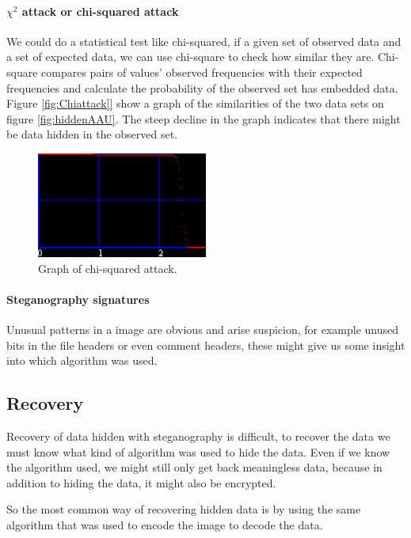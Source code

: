 \paragraph*{$\chi^2$ attack or chi-squared attack}
We could do a statistical test like chi-squared, if a given set of observed data and a set of expected data, we can use chi-square to check how similar they are.
Chi-square compares pairs of values' observed frequencies with their expected frequencies and calculate the probability of the observed set has embedded data.
Figure \ref{fig:Chiattack]} show a graph of the similarities of the two data sets on figure \ref{fig:hiddenAAU}.
The steep decline in the graph indicates that there might be data hidden in the observed set.

\begin{figure}
	\centering
	\includegraphics[width=0.5\textwidth]{figures/ChiSquareAttack.png}
	\caption{Graph of chi-squared attack.}
	\label{fig:Chiattack}
\end{figure}

\paragraph*{Steganography signatures}
Unusual patterns in a image are obvious and arise suspicion, for example unused bits in the file headers or even comment headers, these might give us some insight into which algorithm was used.

\subsection{Recovery}
Recovery of data hidden with steganography is difficult, to recover the data we must know what kind of algorithm was used to hide the data.
Even if we know the algorithm used, we might still only get back meaningless data, because in addition to hiding the data, it might also be encrypted.

So the most common way of recovering hidden data is by using the same algorithm that was used to encode the image to decode the data.
